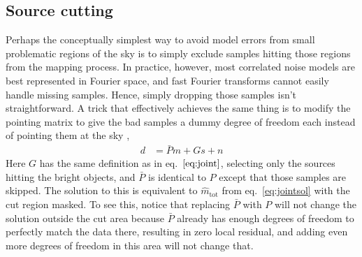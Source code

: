 \documentclass{article}
\begin{document}
%

\subsection{Source cutting}
\label{sect:source-cut}
Perhaps the conceptually simplest way to avoid model errors from small problematic regions
of the sky is to simply exclude samples hitting those regions from the mapping process. In
practice, however, most correlated noise models are best represented in Fourier space, and fast Fourier
transforms cannot easily handle missing samples. Hence, simply dropping those samples isn't
straightforward. A trick that effectively achieves the same thing is to modify the
pointing matrix to give the bad samples a dummy degree of freedom each instead of pointing
them at the sky \citep{dunner/etal/2013},
\begin{align}
d &= \bar P m + Gs + n
\end{align}
Here $G$ has the same definition as in eq.~$\ref{eq:joint}$, selecting only the sources hitting
the bright objects, and $\bar P$ is identical to $P$ except that those samples are skipped.
The solution to this is equivalent to $\hat m_\textrm{tot}$ from eq.~\ref{eq:jointsol} with
the cut region masked. To see this, notice that replacing $\bar P$ with $P$ will not change
the solution outside the cut area because $\bar P$ already has enough degrees of freedom to
perfectly match the data there, resulting in zero local residual, and adding even more degrees of freedom
in this area will not change that.
\end{document}
